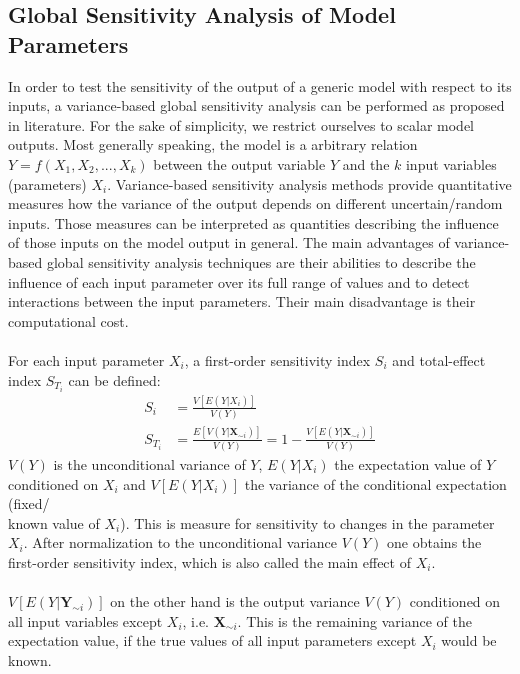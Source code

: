 \documentclass[11pt]{article}
\begin{document}
\subsection{Global Sensitivity Analysis of Model Parameters \cite{Fonoberova2013,Saltelli2002,Saltelli2008}}
In order to test the sensitivity of the output of a generic model with respect to its inputs, a variance-based global sensitivity analysis can be performed as proposed in literature. For the sake of simplicity, we restrict ourselves to scalar model outputs. Most generally speaking, the model is a arbitrary relation $Y = f(X_1,X_2,...,X_k)$ between the output variable $Y$ and the $k$ input variables (parameters) $X_i$. Variance-based sensitivity analysis methods provide quantitative measures how the variance of the output depends on different uncertain/random inputs. Those measures can be interpreted as quantities describing the influence of those inputs on the model output in general. The main advantages of variance-based global sensitivity analysis techniques are their abilities to describe the influence of each input parameter over its full range of values and to detect interactions between the input parameters. Their main disadvantage is their computational cost.\\
\\
For each input parameter $X_i$, a first-order sensitivity index $S_i$ and total-effect index $S_{T_i}$ can be defined:
\begin{align}
S_i &= \frac{V[E(Y|X_i)]}{V(Y)} \label{eqn:first_order}\\
S_{T_i} &= \frac{E[V(Y|\textbf{X}_{\sim i})]}{V(Y)} = 1 - \frac{V[E(Y|\textbf{X}_{\sim i})]}{V(Y)} \label{eqn:total_effect}
\end{align}
$V(Y)$ is the unconditional variance of $Y$, $E(Y|X_i)$ the expectation value of $Y$ conditioned on $X_i$ and $V[E(Y|X_i)]$ the variance of the conditional expectation (fixed/\\known value of $X_i$). This is measure for sensitivity to changes in the parameter $X_i$. After normalization to the unconditional variance $V(Y)$ one obtains the first-order sensitivity index, which is also called the main effect of $X_i$.\\
\\
$V[E(Y|\textbf{Y}_{\sim i})]$ on the other hand is the output variance $V(Y)$ conditioned on all input variables except $X_i$, i.e. $\textbf{X}_{\sim i}$. This is the remaining variance of the expectation value, if the true values of all input parameters except $X_i$ would be known.\\
\end{document}
